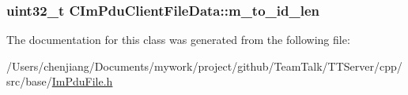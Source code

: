 \subsubsection[{m\+\_\+to\+\_\+id\+\_\+len}]{\setlength{\rightskip}{0pt plus 5cm}uint32\+\_\+t C\+Im\+Pdu\+Client\+File\+Data\+::m\+\_\+to\+\_\+id\+\_\+len\hspace{0.3cm}{\ttfamily [private]}}\label{class_c_im_pdu_client_file_data_a5febf8fb39c4517b09d7430a479fda52}


The documentation for this class was generated from the following file\+:\begin{DoxyCompactItemize}
\item 
/\+Users/chenjiang/\+Documents/mywork/project/github/\+Team\+Talk/\+T\+T\+Server/cpp/src/base/\hyperlink{_im_pdu_file_8h}{Im\+Pdu\+File.\+h}\end{DoxyCompactItemize}
